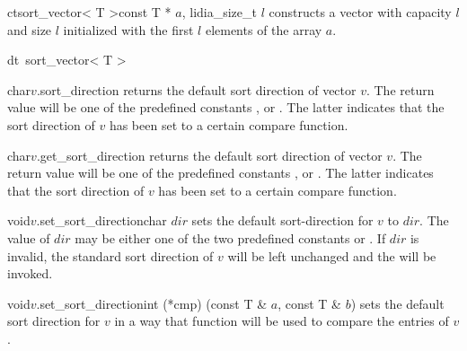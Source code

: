 \begin{fcode}{ct}{sort_vector< T >}{const T * $a$, lidia_size_t $l$}
  constructs a vector with capacity $l$ and size $l$ initialized with the first $l$ elements of
  the array $a$.
\end{fcode}

\begin{fcode}{dt}{~sort_vector< T >}{}
\end{fcode}




\begin{cfcode}{char}{$v$.sort_direction}{}
  returns the default sort direction of vector $v$.  The return value will be one of the
  predefined constants ,  or .
  The latter indicates that the sort direction of $v$ has been set to a certain compare
  function.
\end{cfcode}

\begin{cfcode}{char}{$v$.get_sort_direction}{}
  returns the default sort direction of vector $v$.  The return value will be one of the
  predefined constants ,  or .
  The latter indicates that the sort direction of $v$ has been set to a certain compare
  function.
\end{cfcode}

\begin{fcode}{void}{$v$.set_sort_direction}{char $\mathit{dir}$}
  sets the default sort-direction for $v$ to $\mathit{dir}$.  The value of $\mathit{dir}$ may be
  either one of the two predefined constants  or .
  If $\mathit{dir}$ is invalid, the standard sort direction of $v$ will be left unchanged and
  the \LEH will be invoked.
\end{fcode}

\begin{fcode}{void}{$v$.set_sort_direction}{int (*cmp) (const T & $a$, const T & $b$)}
  sets the default sort direction for $v$ in a way that function  will be used to
  compare the entries of $v$.
\end{fcode}




